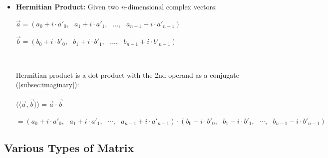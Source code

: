 \begin{tcolorbox}[title={\textbf{\tboxdef{\ref*{subsec:vector-arithmetic}} Vector Arithmetic}}]
\begin{itemize}
$\vec{a} = (a_0, a_1,\ldots, a_{n-1})$, $\vec{b} = (b_0, b_1,\ldots, b_{n-1})$

$ $

Hadamard product is defined as: 

$\vec{a} \odot \vec{b} = (a_0 b_0, \text{ } a_1 b_1, \text{ }\cdots, \text{ } a_{n-1} b_{n-1})$

$ $

\item \textbf{Hermitian Product:} Given two $n$-dimensional complex vectors:

$\vec{a} = (a_0 + i \cdot a'_0, \text{ } a_1+ i\cdot a'_1, \text{ }\ldots,\text{ }  a_{n-1}+ i\cdot a'_{n-1})$ 

$\vec{b} = (b_0 + i\cdot b'_0, \text{ } b_1 + i\cdot b'_1, \text{ }\ldots, \text{ } b_{n-1} + i\cdot b'_{n-1})$

$ $

Hermitian product is a dot product with the 2nd operand as a conjugate (\autoref{subsec:imaginary}): 

$\langle\langle \vec{a}, \vec{b} \rangle\rangle =  \vec{a} \cdot \overline{\vec{b}} $

$ = (a_0 + i \cdot a'_0, \text{ } a_1+ i\cdot a'_1, \text{ }\cdots,\text{ } a_{n-1}+ i\cdot a'_{n-1})  \cdot (b_0 - i\cdot b'_0, \text{ } b_1 - i\cdot b'_1, \text{ }\cdots, \text{ } b_{n-1} - i\cdot b'_{n-1})$




\end{itemize}
\end{tcolorbox}




\subsection{Various Types of Matrix}
\label{subsec:vandermonde}


